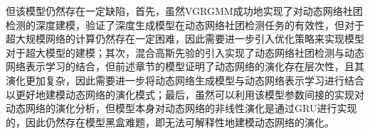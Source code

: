但该模型仍然存在一定缺陷，首先，虽然VGRGMM成功地实现了对动态网络社团检测的深度建模，验证了深度生成模型在动态网络社团检测任务的有效性，但对于超大规模网络的计算仍然存在一定困难，因此需要进一步引入优化策略来实现模型对于超大模型的建模；其次，混合高斯先验的引入实现了动态网络社团检测与动态网络表示学习的结合，但前述章节的模型证明了动态网络的演化存在层次性，且其演化更加复杂，因此需要进一步将动态网络生成模型与动态网络表示学习进行结合以更好地建模动态网络的演化模式；最后，虽然可以利用该模型参数间接的实现对动态网络的演化分析，但模型本身对动态网络的非线性演化是通过GRU进行实现的，因此仍然存在模型黑盒难题，即无法可解释性地建模动态网络的演化。







